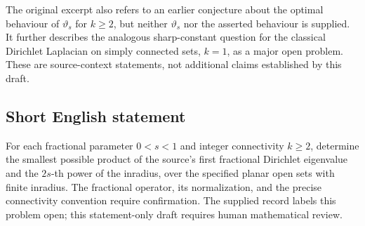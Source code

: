 \documentclass[11pt]{article}
\begin{document}
The original excerpt also refers to an earlier conjecture about the optimal behaviour of \(\vartheta_s\) for \(k\geq2\), but neither \(\vartheta_s\) nor the asserted behaviour is supplied. It further describes the analogous sharp-constant question for the classical Dirichlet Laplacian on simply connected sets, \(k=1\), as a major open problem. These are source-context statements, not additional claims established by this draft.
\subsection{Short English statement}
For each fractional parameter \(0<s<1\) and integer connectivity \(k\geq2\), determine the smallest possible product of the source's first fractional Dirichlet eigenvalue and the \(2s\)-th power of the inradius, over the specified planar open sets with finite inradius. The fractional operator, its normalization, and the precise connectivity convention require confirmation. The supplied record labels this problem open; this statement-only draft requires human mathematical review.
\end{document}
